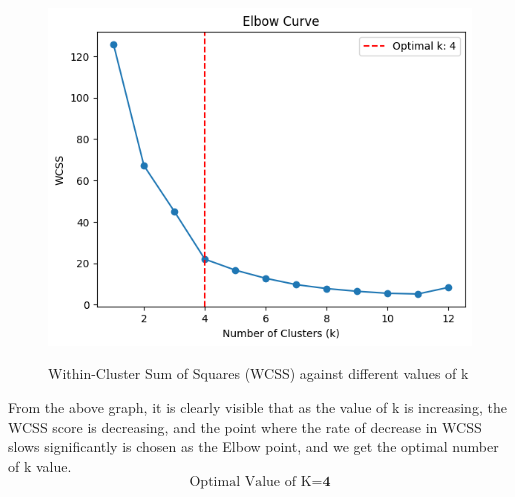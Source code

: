 \documentclass{article}
\begin{document}
\begin{figure}[H] %
    \centering
    \begin{minipage}{1\linewidth}
        \centering
        \includegraphics[scale=0.35]{assets/d-b.png}
        \caption{Within-Cluster Sum of Squares (WCSS) against different values of k}{}
        \label{fig:1c}
    \end{minipage}
\end{figure}

From the above graph, it is clearly visible that as the value of k is increasing, the WCSS score is decreasing, and the point where the rate of decrease in WCSS slows significantly is chosen as the Elbow point, and we get the optimal number of k value.
\[
\text{Optimal Value of K} = \textbf{4}
\]





\end{document}
